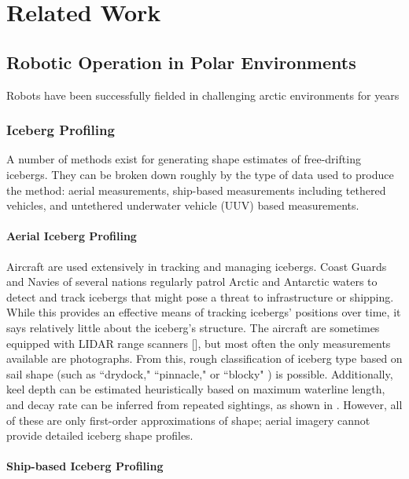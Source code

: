 
\chapter{Related Work}
\label{ch.RelatedWork}

\section{Robotic Operation in Polar Environments}

Robots have been successfully fielded in challenging arctic environments for years

\subsection{Iceberg Profiling}

A number of methods exist for generating shape estimates of free-drifting icebergs. They can be broken down roughly by the type of data used to produce the method: aerial measurements, ship-based measurements including tethered vehicles, and untethered underwater vehicle (UUV) based measurements.

\subsubsection{Aerial Iceberg Profiling}

Aircraft are used extensively in tracking and managing icebergs. Coast Guards and Navies of several nations regularly patrol Arctic and Antarctic waters to detect and track icebergs that might pose a threat to infrastructure or shipping. While this provides an effective means of tracking icebergs' positions over time, it says relatively little about the iceberg's structure. The aircraft are sometimes equipped with LIDAR range scanners [\cite{?}], but most often the only measurements available are photographs. From this, rough classification of iceberg type based on sail shape (such as ``drydock," ``pinnacle," or ``blocky" ) is possible. Additionally, keel depth can be estimated heuristically based on maximum waterline length, and decay rate can be inferred from repeated sightings, as shown in \cite{OceansLTD2004}. However, all of these are only first-order approximations of shape; aerial imagery cannot provide detailed iceberg shape profiles. 

\subsubsection{Ship-based Iceberg Profiling}

